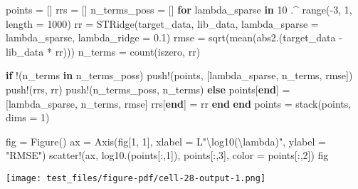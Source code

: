 \documentclass[
]{article}
\newenvironment{Shaded}{\begin{snugshade}}{\end{snugshade}}
\newcommand{\ControlFlowTok}[1]{\textcolor[rgb]{0.00,0.23,0.31}{\textbf{#1}}}
\newcommand{\FloatTok}[1]{\textcolor[rgb]{0.68,0.00,0.00}{#1}}
\newcommand{\FunctionTok}[1]{\textcolor[rgb]{0.28,0.35,0.67}{#1}}
\newcommand{\KeywordTok}[1]{\textcolor[rgb]{0.00,0.23,0.31}{\textbf{#1}}}
\newcommand{\NormalTok}[1]{\textcolor[rgb]{0.00,0.23,0.31}{#1}}
\newcommand{\OperatorTok}[1]{\textcolor[rgb]{0.37,0.37,0.37}{#1}}
\newcommand{\StringTok}[1]{\textcolor[rgb]{0.13,0.47,0.30}{#1}}
\begin{document}
\begin{Shaded}
\begin{Highlighting}[]
\NormalTok{points }\OperatorTok{=}\NormalTok{ []}
\NormalTok{rrs }\OperatorTok{=}\NormalTok{ []}
\NormalTok{n\_terms\_poss }\OperatorTok{=}\NormalTok{ []}
\ControlFlowTok{for}\NormalTok{ lambda\_sparse }\KeywordTok{in} \FloatTok{10} \OperatorTok{.\^{}} \FunctionTok{range}\NormalTok{(}\OperatorTok{{-}}\FloatTok{3}\NormalTok{, }\FloatTok{1}\NormalTok{, length }\OperatorTok{=} \FloatTok{1000}\NormalTok{)}
\NormalTok{  rr }\OperatorTok{=} \FunctionTok{STRidge}\NormalTok{(target\_data, lib\_data, lambda\_sparse }\OperatorTok{=}\NormalTok{ lambda\_sparse, lambda\_ridge }\OperatorTok{=} \FloatTok{0.1}\NormalTok{)}
\NormalTok{  rmse }\OperatorTok{=} \FunctionTok{sqrt}\NormalTok{(}\FunctionTok{mean}\NormalTok{(}\FunctionTok{abs2}\NormalTok{.(target\_data }\OperatorTok{{-}}\NormalTok{ lib\_data }\OperatorTok{*}\NormalTok{ rr)))}
\NormalTok{  n\_terms }\OperatorTok{=} \FunctionTok{count}\NormalTok{(iszero, rr)}

  \ControlFlowTok{if}\NormalTok{ !(n\_terms }\KeywordTok{in}\NormalTok{ n\_terms\_poss)}
    \FunctionTok{push!}\NormalTok{(points, [lambda\_sparse, n\_terms, rmse])}
    \FunctionTok{push!}\NormalTok{(rrs, rr)}
    \FunctionTok{push!}\NormalTok{(n\_terms\_poss, n\_terms)}
  \ControlFlowTok{else}
\NormalTok{    points[}\KeywordTok{end}\NormalTok{] }\OperatorTok{=}\NormalTok{ [lambda\_sparse, n\_terms, rmse]}
\NormalTok{    rrs[}\KeywordTok{end}\NormalTok{] }\OperatorTok{=}\NormalTok{ rr}
  \ControlFlowTok{end}
\ControlFlowTok{end}
\NormalTok{points }\OperatorTok{=} \FunctionTok{stack}\NormalTok{(points, dims }\OperatorTok{=} \FloatTok{1}\NormalTok{)}

\NormalTok{fig }\OperatorTok{=} \FunctionTok{Figure}\NormalTok{()}
\NormalTok{ax }\OperatorTok{=} \FunctionTok{Axis}\NormalTok{(fig[}\FloatTok{1}\NormalTok{, }\FloatTok{1}\NormalTok{], xlabel }\OperatorTok{=}\NormalTok{ L}\StringTok{"\textbackslash{}log10(\textbackslash{}lambda)"}\NormalTok{, ylabel }\OperatorTok{=} \StringTok{"RMSE"}\NormalTok{)}
\FunctionTok{scatter!}\NormalTok{(ax, }\FunctionTok{log10}\NormalTok{.(points[}\OperatorTok{:}\NormalTok{,}\FloatTok{1}\NormalTok{]), points[}\OperatorTok{:}\NormalTok{,}\FloatTok{3}\NormalTok{], color }\OperatorTok{=}\NormalTok{ points[}\OperatorTok{:}\NormalTok{,}\FloatTok{2}\NormalTok{])}
\NormalTok{fig}
\end{Highlighting}
\end{Shaded}

\texttt{[image: test\_files/figure-pdf/cell-28-output-1.png]}
\end{document}
